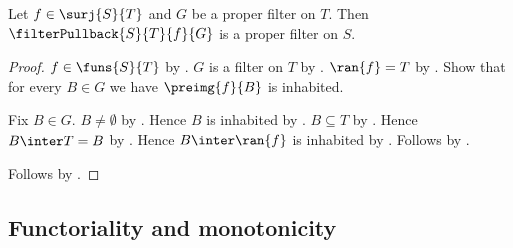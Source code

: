 \begin{corollary}\label{surjective_filter_pullback_preserves_properness}
    Let $f\in\surj{S}{T}$ and $G$ be a proper filter on $T$.
    Then $\filterPullback{S}{T}{f}{G}$ is a proper filter on $S$.
\end{corollary}
\begin{proof}
    $f\in\funs{S}{T}$ by .
    $G$ is a filter on $T$ by .
    $\ran{f}=T$ by .
    Show that for every $B\in G$ we have $\preimg{f}{B}$ is inhabited.
    \begin{subproof}
        Fix $B\in G$.
        $B\neq\emptyset$ by .
        Hence $B$ is inhabited by .
        $B\subseteq T$ by .
        Hence $B\inter T=B$ by .
        Hence $B\inter\ran{f}$ is inhabited by \auto.
        Follows by .
    \end{subproof}
    Follows by .
\end{proof}

\subsection{Functoriality and monotonicity}

